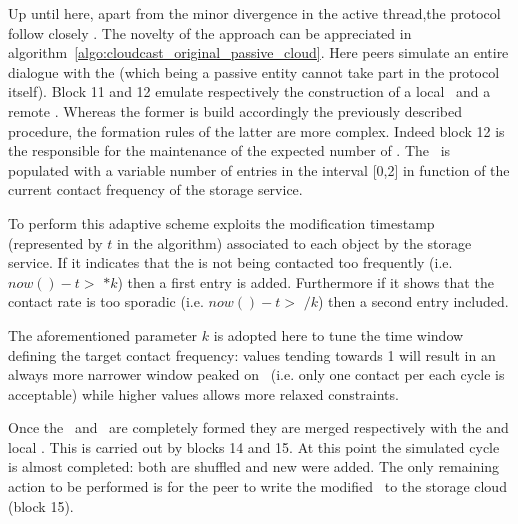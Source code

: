Up until here, apart from the minor divergence in the active
thread,the protocol follow closely \cyclon. The novelty of the
approach can be appreciated in
algorithm~\ref{algo:cloudcast_original_passive_cloud}.
Here peers simulate an entire dialogue with the \cloud (which being
a passive entity cannot take part in the protocol
itself). Block 11 and 12 emulate respectively
the construction of a local \request\ and a remote \reply. Whereas
the former is build accordingly the previously described procedure,
the formation rules of the latter are more complex. Indeed
block 12 is the responsible for the maintenance of the
expected number of \cloud \descriptors. The \reply\ is populated with
a variable number of \cloud entries in the interval [0,2] in function
of the current contact frequency of the storage service.

To perform this adaptive scheme \cloudcast exploits the modification
timestamp (represented by $t$ in the algorithm) associated to each
object by the storage service. If it indicates that the \cloud is not
being contacted too frequently (i.e. $now() - t >$ \deltacyclon $* k$)
then a first entry is added. Furthermore if it shows that the contact
rate is too sporadic (i.e. $now() - t >$ \deltacyclon $/ k$) then a
second entry included.

The aforementioned parameter $k$ is adopted here to tune the time
window defining the target contact frequency: values tending towards 1
will result in an always more narrower window peaked on \deltacyclon\
(i.e. only one contact per each \cyclon cycle is acceptable) while
higher values allows more relaxed constraints.

Once the \request\ and \reply\ are completely formed they are merged
respectively with the \cloud and local \view. This is carried out by
blocks 14 and 15. At this point the
simulated cycle is almost completed: both \views are shuffled and new
\descriptors were added. The only remaining action to be performed is
for the peer to write the modified \view\ to the storage cloud
(block 15).

